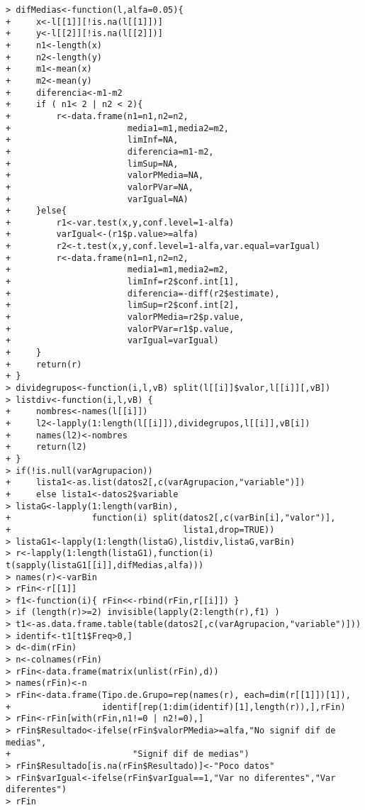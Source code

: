 \begin{solucion}
\begin{verbatim}
> difMedias<-function(l,alfa=0.05){
+     x<-l[[1]][!is.na(l[[1]])]
+     y<-l[[2]][!is.na(l[[2]])]
+     n1<-length(x)
+     n2<-length(y)
+     m1<-mean(x)
+     m2<-mean(y)
+     diferencia<-m1-m2
+     if ( n1< 2 | n2 < 2){
+         r<-data.frame(n1=n1,n2=n2,
+                       media1=m1,media2=m2,
+                       limInf=NA,
+                       diferencia=m1-m2,
+                       limSup=NA,
+                       valorPMedia=NA,
+                       valorPVar=NA,
+                       varIgual=NA)
+     }else{ 
+         r1<-var.test(x,y,conf.level=1-alfa)
+         varIgual<-(r1$p.value>=alfa)
+         r2<-t.test(x,y,conf.level=1-alfa,var.equal=varIgual)
+         r<-data.frame(n1=n1,n2=n2,
+                       media1=m1,media2=m2,
+                       limInf=r2$conf.int[1],
+                       diferencia=-diff(r2$estimate),
+                       limSup=r2$conf.int[2],
+                       valorPMedia=r2$p.value,
+                       valorPVar=r1$p.value,
+                       varIgual=varIgual)
+     }
+     return(r)
+ }
> dividegrupos<-function(i,l,vB) split(l[[i]]$valor,l[[i]][,vB])
> listdiv<-function(i,l,vB) {
+     nombres<-names(l[[i]])
+     l2<-lapply(1:length(l[[i]]),dividegrupos,l[[i]],vB[i])
+     names(l2)<-nombres
+     return(l2)
+ }
> if(!is.null(varAgrupacion)) 
+     lista1<-as.list(datos2[,c(varAgrupacion,"variable")])
+     else lista1<-datos2$variable
> listaG<-lapply(1:length(varBin),
+                function(i) split(datos2[,c(varBin[i],"valor")],
+                                  lista1,drop=TRUE))
> listaG1<-lapply(1:length(listaG),listdiv,listaG,varBin)
> r<-lapply(1:length(listaG1),function(i) t(sapply(listaG1[[i]],difMedias,alfa)))
> names(r)<-varBin
> rFin<-r[[1]]
> f1<-function(i){ rFin<<-rbind(rFin,r[[i]]) }
> if (length(r)>=2) invisible(lapply(2:length(r),f1) )
> t1<-as.data.frame.table(table(datos2[,c(varAgrupacion,"variable")]))
> identif<-t1[t1$Freq>0,]
> d<-dim(rFin)
> n<-colnames(rFin)
> rFin<-data.frame(matrix(unlist(rFin),d))
> names(rFin)<-n
> rFin<-data.frame(Tipo.de.Grupo=rep(names(r), each=dim(r[[1]])[1]),
+                  identif[rep(1:dim(identif)[1],length(r)),],rFin)
> rFin<-rFin[with(rFin,n1!=0 | n2!=0),]
> rFin$Resultado<-ifelse(rFin$valorPMedia>=alfa,"No signif dif de medias",
+                        "Signif dif de medias")
> rFin$Resultado[is.na(rFin$Resultado)]<-"Poco datos"
> rFin$varIgual<-ifelse(rFin$varIgual==1,"Var no diferentes","Var diferentes")
> rFin
 \end{verbatim}
 \vspace{-0.5cm}

\end{solucion}
